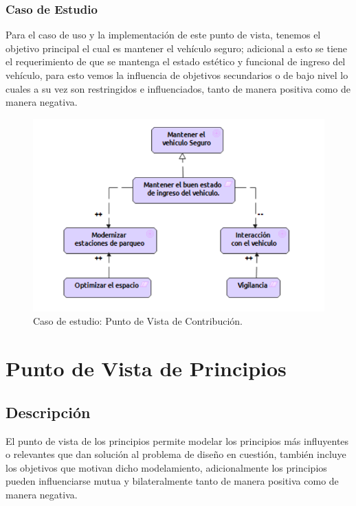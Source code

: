 \subsubsection{Caso de Estudio}
Para el caso de uso y la implementación de este punto de vista, tenemos el objetivo principal el cual es mantener el vehículo seguro; adicional a esto se tiene el requerimiento de que se mantenga el estado estético y funcional de ingreso del vehículo, para esto vemos la influencia de objetivos secundarios o de bajo nivel lo cuales a su vez son restringidos e influenciados, tanto de manera positiva como de manera negativa.

\begin{figure}[h]
	\centering
	\includegraphics[width=1.0\textwidth]{imagenes/Caso_Estudio/Motivacion/Contribucion.PDF}
	\caption{Caso de estudio: Punto de Vista de Contribución.}
	\label{fig:gap_analysis}
\end{figure}

\section{Punto de Vista de Principios}
\subsection{Descripción}
El punto de vista de los principios permite modelar los principios más  influyentes o relevantes que dan  solución al problema de diseño en cuestión, también incluye los objetivos que motivan dicho modelamiento, adicionalmente los principios pueden influenciarse mutua y bilateralmente tanto de manera positiva como de manera negativa.

